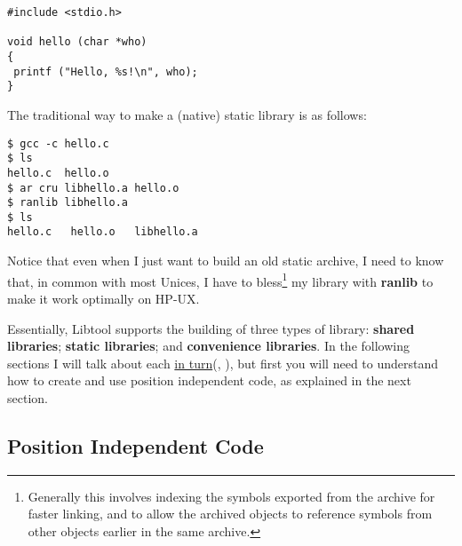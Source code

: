  
\begin{verbatim}
#include <stdio.h>

void hello (char *who)
{
 printf ("Hello, %s!\n", who);
}
\end{verbatim}

The traditional way to make a (native) static library is as follows: 

\begin{Verbatim}[frame=single]
$ gcc -c hello.c
$ ls
hello.c  hello.o
$ ar cru libhello.a hello.o
$ ranlib libhello.a
$ ls
hello.c   hello.o   libhello.a
\end{Verbatim}

 Notice that even when I just want to build an old static archive, I need to 
 know that, in common with most Unices, I have to bless\footnote{Generally
 this involves indexing the symbols exported from the archive for faster 
 linking, and to allow the archived objects to reference symbols from other 
 objects earlier in the same archive.} my library with \textbf{ranlib} to make 
 it work optimally on HP-UX. 


Essentially, Libtool supports the building of three types of library:
\textbf{shared libraries}; \textbf{static libraries}; and \textbf{convenience
libraries}. In the following sections I will talk about
each \underline{in turn}({\MaQ{}}, {\MjQ{}}), but first you will need to understand 
how to create and use position independent code, as explained in the next 
section. 

\subsection{Position Independent Code}\label{SS_Position_Independent_Code}

